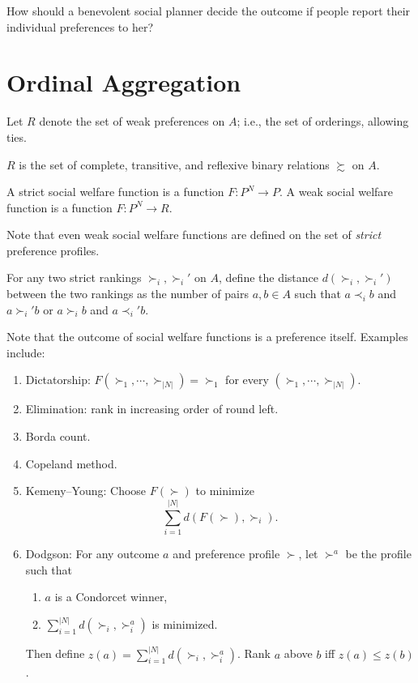 
How should a benevolent social planner decide the outcome if people report their individual preferences to her?

\section{Ordinal Aggregation}

\begin{notation}
	Let $R$ denote the set of weak preferences on $A$; i.e., the set of orderings, allowing ties.
\end{notation}

$R$ is the set of complete, transitive, and reflexive binary relations $\succsim$ on $A.$

\begin{definition}
	A strict social welfare function is a function $F: P^N \to P$. A weak social welfare function is a function $F: P^N \to R$.
\end{definition}

Note that even weak social welfare functions are defined on the set of \emph{strict} preference profiles.

\begin{definition} \label{3-30-2}
	For any two strict rankings $\succ_i, \succ_i'$ on $A$, define the distance $d(\succ_i, \succ_i')$ between the two rankings as the number of pairs $a,b \in A$ such that $a \prec_i b$ and $a\succ_i' b$ or $a \succ_i b$ and $a\prec_i' b$.
\end{definition}

Note that the outcome of social welfare functions is a preference itself. Examples include:
\begin{enumerate}[label = (\roman*)]
	\item Dictatorship: $F\left( \succ_1, \cdots, \succ_{\left| N \right|} \right) = \succ_1$ for every $\left( \succ_1, \cdots, \succ_{\left| N \right|} \right)$.
	\item Elimination: rank in increasing order of round left.
	\item Borda count.
	\item Copeland method. 
	\item Kemeny--Young: Choose $F(\succ)$ to minimize \[
		\sum\limits_{i=1}^{\left| N \right|} d\left( F(\succ), \succ_i \right)
	.\] 
	\item Dodgson: For any outcome $a$ and preference profile $\succ$, let $\succ^{a}$ be the profile such that
		\begin{enumerate}[label = (\roman*)]
			\item $a$ is a Condorcet winner,
			\item $\sum_{i=1}^{\left| N \right|} d(\succ_i, \succ_i^a)$ is minimized.
		\end{enumerate}
	Then define $z(a) = \sum_{i=1}^{\left| N \right|} d(\succ_i, \succ_i^{a})$. Rank $a$ above $b$ iff $z(a) \le z(b)$.
\end{enumerate}


